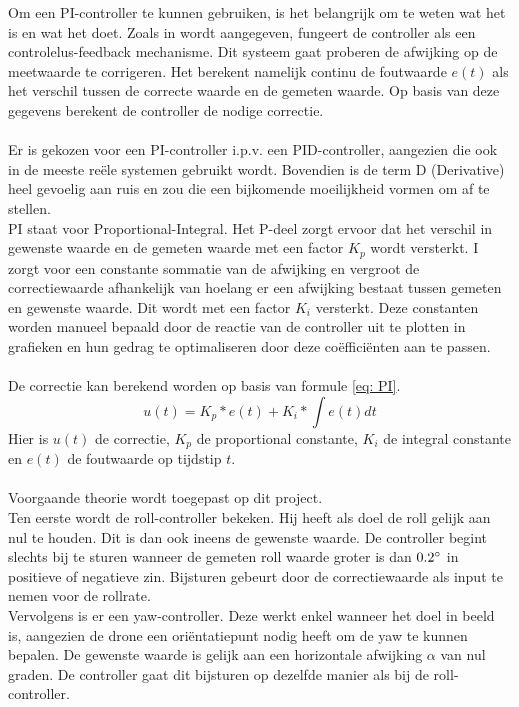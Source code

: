 \noindent
Om een PI-controller te kunnen gebruiken, is het belangrijk om te weten wat het is en wat het doet. Zoals in \cite{website:PIDController} wordt aangegeven, fungeert de controller als een controlelus-feedback mechanisme. Dit systeem gaat proberen de afwijking op de meetwaarde te corrigeren. Het berekent namelijk continu de foutwaarde \(e(t)\) als het verschil tussen de correcte waarde en de gemeten waarde. Op basis van deze gegevens berekent de controller de nodige correctie.
\\
\\
Er is gekozen voor een PI-controller i.p.v. een PID-controller, aangezien die ook in de meeste re\"ele systemen gebruikt wordt. Bovendien is de term D (Derivative) heel gevoelig aan ruis en zou die een bijkomende moeilijkheid vormen om af te stellen.
\\
PI staat voor Proportional-Integral. Het P-deel zorgt ervoor dat het verschil in gewenste waarde en de gemeten waarde met een factor $K_p$ wordt versterkt. 
I zorgt voor een constante sommatie van de afwijking en vergroot de correctiewaarde afhankelijk van hoelang er een afwijking bestaat tussen gemeten en gewenste waarde. Dit wordt met een factor $K_i$ versterkt. Deze constanten worden manueel bepaald door de reactie van de controller uit te plotten in grafieken en hun gedrag te optimaliseren door deze co\"effici\"enten aan te passen.
\\
\\
De correctie kan berekend worden op basis van formule \ref{eq: PI}.
\begin{equation} \label{eq: PI}
	u(t) = K_p * e(t) + K_i * \int e(t) dt
\end{equation}
Hier is \(u(t)\) de correctie, $K_p$ de proportional constante, $K_i$ de integral constante en \(e(t)\) de foutwaarde op tijdstip \(t\).
\\
\\
Voorgaande theorie wordt toegepast op dit project.
\\
Ten eerste wordt de roll-controller bekeken. Hij heeft als doel de roll gelijk aan nul te houden. Dit is dan ook ineens de gewenste waarde. De controller begint slechts bij te sturen wanneer de gemeten roll waarde groter is dan \(0.2\degree\) in positieve of negatieve zin. Bijsturen gebeurt door de correctiewaarde als input te nemen voor de rollrate.
\\
Vervolgens is er een yaw-controller. Deze werkt enkel wanneer het doel in beeld is, aangezien de drone een ori\"entatiepunt nodig heeft om de yaw te kunnen bepalen. De gewenste waarde is gelijk aan een horizontale afwijking $\alpha$ van nul graden. De controller gaat dit bijsturen op dezelfde manier als bij de roll-controller.
